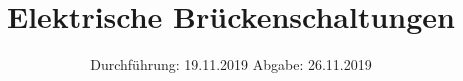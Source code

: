 

\subject{Versuch 302}
\title{Elektrische Brückenschaltungen}
\date{%
  Durchführung: 19.11.2019
  \hspace{3em}
  Abgabe: 26.11.2019
}



\maketitle
\thispagestyle{empty}
\tableofcontents
\newpage





\nocite{*}
\printbibliography{}


